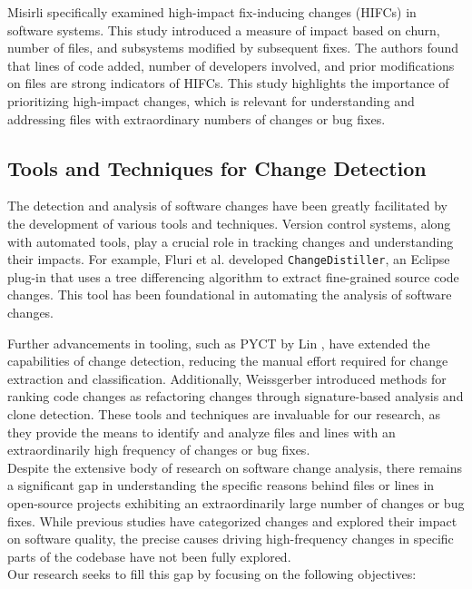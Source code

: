 \documentclass{article}
\begin{document}
Misirli \cite{misirli2016studying} specifically examined high-impact fix-inducing changes (HIFCs) in software systems. This study introduced a measure of impact based on churn, number of files, and subsystems modified by subsequent fixes. The authors found that lines of code added, number of developers involved, and prior modifications on files are strong indicators of HIFCs. This study highlights the importance of prioritizing high-impact changes, which is relevant for understanding and addressing files with extraordinary numbers of changes or bug fixes. 

\subsection{Tools and Techniques for Change Detection}
The detection and analysis of software changes have been greatly facilitated by the development of various tools and techniques. Version control systems, along with automated tools, play a crucial role in tracking changes and understanding their impacts. For example, Fluri et al. \cite{fluri2007change} developed \texttt{ChangeDistiller}, an Eclipse plug-in that uses a tree differencing algorithm to extract fine-grained source code changes. This tool has been foundational in automating the analysis of software changes.

Further advancements in tooling, such as PYCT by Lin \cite{lin2016empirical}, have extended the capabilities of change detection, reducing the manual effort required for change extraction and classification. Additionally, Weissgerber \cite{weissgerber2006identifying} introduced methods for ranking code changes as refactoring changes through signature-based analysis and clone detection. These tools and techniques are invaluable for our research, as they provide the means to identify and analyze files and lines with an extraordinarily high frequency of changes or bug fixes.
\\

Despite the extensive body of research on software change analysis, there remains a significant gap in understanding the specific reasons behind files or lines in open-source projects exhibiting an extraordinarily large number of changes or bug fixes. While previous studies have categorized changes and explored their impact on software quality, the precise causes driving high-frequency changes in specific parts of the codebase have not been fully explored.\\

Our research seeks to fill this gap by focusing on the following objectives:
\end{document}
